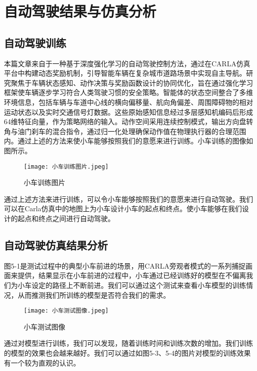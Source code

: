 \chapter{自动驾驶结果与仿真分析}

\section{自动驾驶训练}

本篇文章来自于一种基于深度强化学习的自动驾驶控制方法，通过在CARLA仿真平台中构建动态奖励机制，引导智能车辆在复杂城市道路场景中实现自主导航。研究聚焦于车辆状态感知、动作决策与奖励函数设计的协同优化，旨在通过强化学习框架使车辆逐步学习符合人类驾驶习惯的安全策略。智能体的状态空间整合了多维环境信息，包括车辆与车道中心线的横向偏移量、航向角偏差、周围障碍物的相对运动状态以及实时交通信号灯数据。这些原始感知信息经过多层感知机编码后形成64维特征向量，作为策略网络的输入。动作空间采用连续控制模式，输出方向盘转角与油门刹车的混合指令，通过归一化处理确保动作值在物理执行器的合理范围内。通过上述的方法来使小车能够按照我们的意愿来进行训练。小车训练的图像如图所示。

\begin{figure}[hbt]
	\centering
	\texttt{[image: 小车训练图片.jpeg]}
	\caption{小车训练图片}
	\label{f.example}
\end{figure}

通过上述方法来进行训练，可以令小车能够按照我们的意愿来进行自动驾驶。我们可以在Carla仿真中的地图上为小车设计小车的起点和终点。使小车能够在我们设计的起点和终点之间进行自动驾驶。


\section{自动驾驶仿真结果分析}


图5-1是测试过程中的典型小车前进的场景，用CARLA旁观者模式的一系列捕捉画面来提供，结果显示在小车前进的过程中，小车通过已经训练好的模型在不偏离我们为小车设定的路径上不断前进。我们可以通过这个测试来查看小车模型的训练情况，从而推测我们所训练的模型是否符合我们的需求。

\begin{figure}[hbt]
	\centering
	\texttt{[image: 小车测试图像.jpeg]}
	\caption{小车测试图像}
	\label{f.example}
\end{figure}

通过对模型进行训练，我们可以发现，随着训练时间和训练次数的增加。我们训练的模型的效果也会越来越好。我们可以通过如图5-3、5-4的图片对模型的训练效果有一个较为直观的认识。

